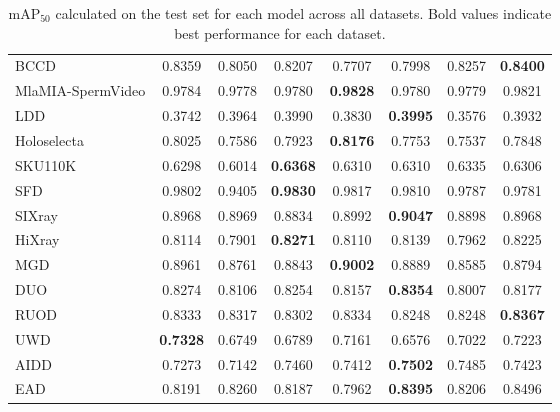 \documentclass[runningheads]{llncs}
\begin{document}
\begin{table}[htbp]
\begin{tabular}{lccccccc}
\hline
BCCD & 0.8359 & 0.8050 & 0.8207 & 0.7707 & 0.7998 & 0.8257 & \textbf{0.8400} \\
MlaMIA-SpermVideo & 0.9784 & 0.9778 & 0.9780 & \textbf{0.9828} & 0.9780 & 0.9779 & 0.9821 \\
LDD& 0.3742 & 0.3964 & 0.3990 & 0.3830 & \textbf{0.3995} & 0.3576 & 0.3932 \\
\hline
Holoselecta & 0.8025 & 0.7586 & 0.7923 & \textbf{0.8176} & 0.7753 & 0.7537 & 0.7848 \\
SKU110K & 0.6298 & 0.6014 & \textbf{0.6368} & 0.6310 & 0.6310 & 0.6335 & 0.6306 \\
SFD & 0.9802 & 0.9405 & \textbf{0.9830} & 0.9817 & 0.9810 & 0.9787 & 0.9781 \\
\hline
SIXray & 0.8968 & 0.8969 & 0.8834 & 0.8992 & \textbf{0.9047} & 0.8898 & 0.8968 \\
HiXray & 0.8114 & 0.7901 & \textbf{0.8271} & 0.8110 & 0.8139 & 0.7962 & 0.8225 \\
MGD & 0.8961 & 0.8761 & 0.8843 & \textbf{0.9002} & 0.8889 & 0.8585 & 0.8794 \\
\hline
DUO & 0.8274 & 0.8106 & 0.8254 & 0.8157 & \textbf{0.8354} & 0.8007 & 0.8177 \\
RUOD & 0.8333 & 0.8317 & 0.8302 & 0.8334 & 0.8248 & 0.8248 & \textbf{0.8367} \\
UWD & \textbf{0.7328} & 0.6749 & 0.6789 & 0.7161 & 0.6576 & 0.7022 & 0.7223 \\
\hline
AIDD & 0.7273 & 0.7142 & 0.7460 & 0.7412 & \textbf{0.7502} & 0.7485 & 0.7423 \\
EAD & 0.8191 & 0.8260 & 0.8187 & 0.7962 & \textbf{0.8395} & 0.8206 & 0.8496 \\
\hline
\end{tabular}
\caption{mAP$_{50}$ calculated on the test set for each model across all datasets. Bold values indicate best performance for each dataset.}
\label{tab:yolo_map50_comparison}
\end{table}
\end{document}
